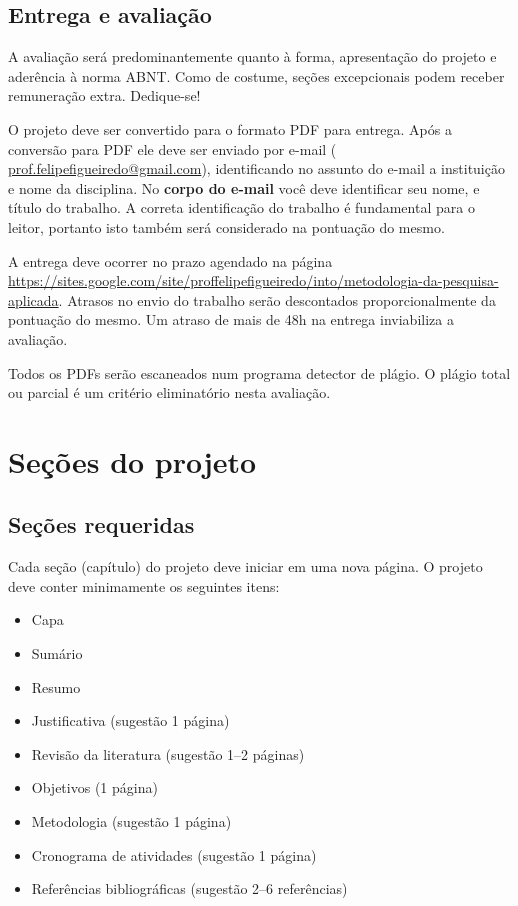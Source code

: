 \documentclass[a4paper]{article}
\begin{document}
\subsection{Entrega e avaliação}

A avaliação será predominantemente quanto à forma, apresentação do projeto e aderência à norma ABNT.
Como de costume, seções excepcionais podem receber remuneração extra.
Dedique-se!

O projeto deve ser convertido para o formato PDF para entrega.
Após a conversão para PDF ele deve ser enviado por e-mail ( \url{prof.felipefigueiredo@gmail.com}), identificando no assunto do e-mail a instituição e nome da disciplina.
No {\bf corpo do e-mail} você deve identificar seu nome, e título do trabalho.
A correta identificação do trabalho é fundamental para o leitor, portanto isto também será considerado na pontuação do mesmo.

A entrega deve ocorrer no prazo agendado na página \url{https://sites.google.com/site/proffelipefigueiredo/into/metodologia-da-pesquisa-aplicada}.
Atrasos no envio do trabalho serão descontados proporcionalmente da pontuação do mesmo.
Um atraso de mais de 48h na entrega inviabiliza a avaliação.

Todos os PDFs serão escaneados num programa detector de plágio.
O plágio total ou parcial é um critério eliminatório nesta avaliação.

\section{Seções do projeto}

\subsection{Seções requeridas}

Cada seção (capítulo) do projeto deve iniciar em uma nova página. O projeto deve
conter minimamente os seguintes itens:

\begin{itemize}
\item Capa
\item Sumário
\item Resumo
\item Justificativa (sugestão 1 página)
\item Revisão da literatura (sugestão 1--2 páginas)
\item Objetivos (1 página)
\item Metodologia (sugestão 1 página)
\item Cronograma de atividades (sugestão 1 página)
\item Referências bibliográficas (sugestão 2--6 referências)
\end{itemize}
\end{document}
